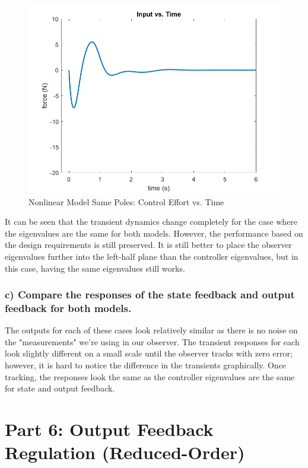 \documentclass[12pt, letterpaper, onecolumn]{article}
\begin{document}
\begin{figure}[!h]
    \centering
    \includegraphics[width=\linewidth]{figs/p5-cnl-input.png}
    \caption{Nonlinear Model Same Poles: Control Effort vs. Time}
    \label{}
\end{figure}

\clearpage
It can be seen that the transient dynamics change completely for the case where the eigenvalues are the same for both models. However, the performance based on the design requirements is still preserved. It is still better to place the observer eigenvalues further into the left-half plane than the controller eigenvalues, but in this case, having the same eigenvalues still works.

\subsubsection*{c) Compare the responses of the state feedback and output feedback for both models.}
The outputs for each of these cases look relatively similar as there is no noise on the "measurements" we're using in our observer. The transient responses for each look slightly different on a small scale until the observer tracks with zero error; however, it is hard to notice the difference in the transients graphically. Once tracking, the responses look the same as the controller eigenvalues are the same for state and output feedback.
\clearpage

\section*{Part 6: Output Feedback Regulation (Reduced-Order)}
\end{document}
